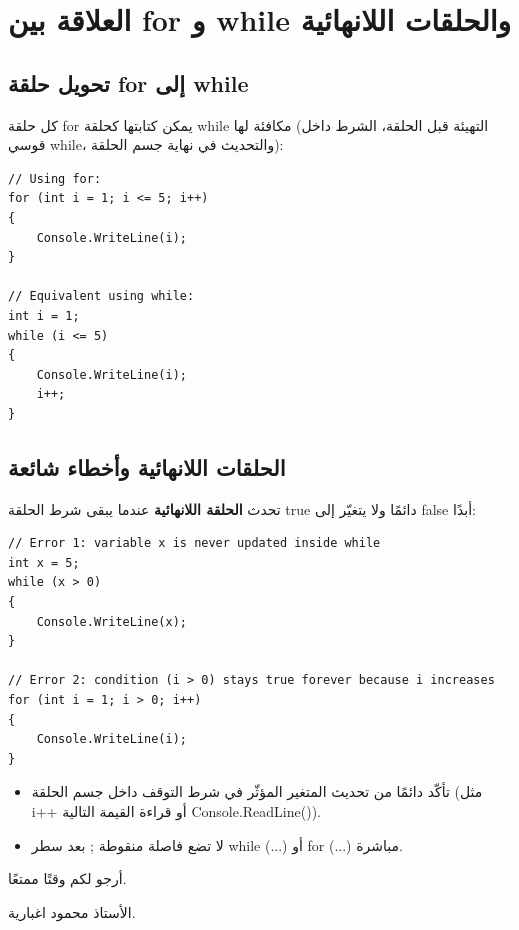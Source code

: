 \documentclass[14pt]{extarticle}
\begin{document}
\clearpage
\section{العلاقة بين \textenglish{for} و \textenglish{while} والحلقات اللانهائية}

\subsection{تحويل حلقة \textenglish{for} إلى \textenglish{while}}
كل حلقة \textenglish{for} يمكن كتابتها كحلقة \textenglish{while} مكافئة لها (التهيئة قبل الحلقة، الشرط داخل قوسي \textenglish{while}، والتحديث في نهاية جسم الحلقة):

\begin{boxCode}
\begin{english}
\begin{verbatim}
// Using for:
for (int i = 1; i <= 5; i++)
{
    Console.WriteLine(i);
}

// Equivalent using while:
int i = 1;
while (i <= 5)
{
    Console.WriteLine(i);
    i++;
}
\end{verbatim}
\end{english}
\end{boxCode}

\filbreak
\subsection{الحلقات اللانهائية وأخطاء شائعة}
تحدث \textbf{الحلقة اللانهائية} عندما يبقى شرط الحلقة \textenglish{true} دائمًا ولا يتغيّر إلى \textenglish{false} أبدًا:

\begin{boxExample}
\begin{english}
\begin{verbatim}
// Error 1: variable x is never updated inside while
int x = 5;
while (x > 0)
{
    Console.WriteLine(x);
}

// Error 2: condition (i > 0) stays true forever because i increases
for (int i = 1; i > 0; i++)
{
    Console.WriteLine(i);
}
\end{verbatim}
\end{english}
\end{boxExample}

\begin{boxWarning}
\begin{itemize}[nosep]
    \item تأكّد دائمًا من تحديث المتغير المؤثّر في شرط التوقف داخل جسم الحلقة (مثل \textenglish{i++} أو قراءة القيمة التالية \textenglish{Console.ReadLine()}).
    \item لا تضع فاصلة منقوطة \textenglish{;} بعد سطر \textenglish{while (...)} أو \textenglish{for (...)} مباشرة.
\end{itemize}
\end{boxWarning}

\vspace{1cm}
\begin{flushleft}
أرجو لكم وقتًا ممتعًا.

الأستاذ محمود اغبارية.
\end{flushleft}
\end{document}
